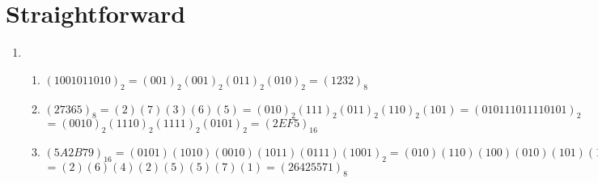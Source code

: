 \documentclass[a4paper]{article}
\begin{document}
\section{Straightforward}
    \begin{enumerate}
        \item \begin{enumerate}
            \item $(1001011010)_2 = (001)_2(001)_2(011)_2(010)_2 = (1232)_8$ \\

            \item $(27365)_8 = (2)(7)(3)(6)(5) = (010)_2(111)_2(011)_2(110)_2(101) = (010111011110101)_2$\\
            $ = (0010)_2(1110)_2(1111)_2(0101)_2 = (2EF5)_{16}$ \\
            
            \item $(5A2B79)_{16} = (0101)(1010)(0010)(1011)(0111)(1001)_2 = (010)(110)(100)(010)(101)(101)(111)(001)$
            $ = (2)(6)(4)(2)(5)(5)(7)(1) = (26425571)_8$ \\ \\ \\
        \end{enumerate}


\end{enumerate}
\end{document}
